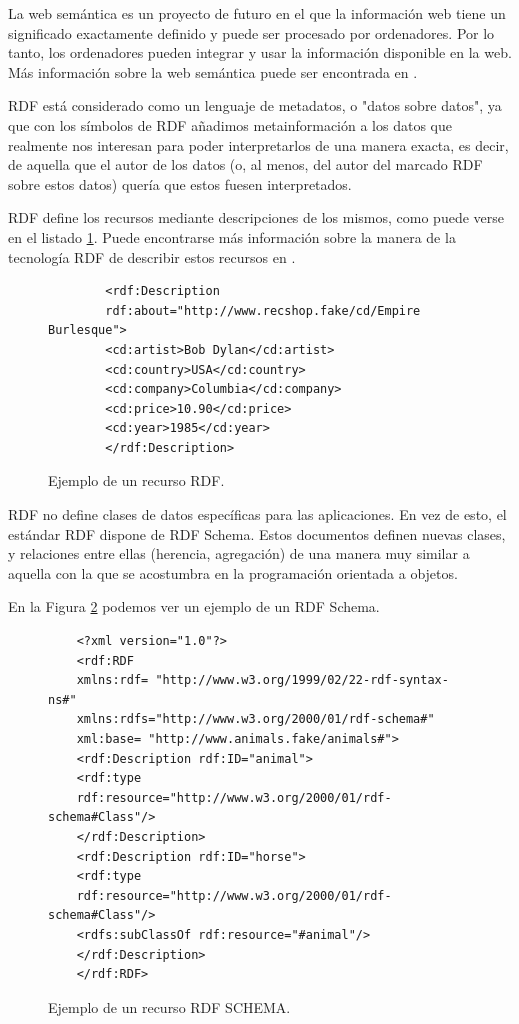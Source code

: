 La web semántica es un proyecto de futuro en el que la información web tiene un significado exactamente definido y puede ser procesado por ordenadores. Por lo tanto, los ordenadores pueden integrar y usar la información disponible en la web. Más información sobre la web semántica puede ser encontrada en \cite{iswc2007}.

RDF está considerado como un lenguaje de metadatos, o "datos sobre datos", ya que con los símbolos de RDF añadimos metainformación a los datos que realmente nos interesan para poder interpretarlos de una manera exacta, es decir, de aquella que el autor de los datos (o, al menos, del autor del marcado RDF sobre estos datos) quería que estos fuesen interpretados.

RDF define los recursos mediante descripciones de los mismos, como puede verse en el listado \ref{fig:ejemploRDF1}. Puede encontrarse más información sobre la manera de la tecnología RDF de describir estos recursos en \cite{champin2002rdf}.

\begin{figure}[h]
	\centering
	\begin{verbatim}
		<rdf:Description
		rdf:about="http://www.recshop.fake/cd/Empire Burlesque">
		<cd:artist>Bob Dylan</cd:artist>
		<cd:country>USA</cd:country>
		<cd:company>Columbia</cd:company>
		<cd:price>10.90</cd:price>
		<cd:year>1985</cd:year>
		</rdf:Description>
	\end{verbatim}
	\caption{ Ejemplo de un recurso RDF.}
	\label{fig:ejemploRDF1}
\end{figure}


RDF no define clases de datos específicas para las aplicaciones. En vez de esto, el estándar RDF dispone de RDF Schema. Estos documentos definen nuevas clases, y relaciones entre ellas (herencia, agregación) de una manera muy similar a aquella con la que se acostumbra en la programación orientada a objetos. 

En la Figura \ref{fig:ejemploRDF2} podemos ver un ejemplo de un RDF Schema.


\begin{figure}[t]
	\centering
\begin{verbatim}
	<?xml version="1.0"?>
	<rdf:RDF
	xmlns:rdf= "http://www.w3.org/1999/02/22-rdf-syntax-ns#"
	xmlns:rdfs="http://www.w3.org/2000/01/rdf-schema#"
	xml:base= "http://www.animals.fake/animals#">
	<rdf:Description rdf:ID="animal">
	<rdf:type
	rdf:resource="http://www.w3.org/2000/01/rdf-schema#Class"/>
	</rdf:Description>
	<rdf:Description rdf:ID="horse">
	<rdf:type
	rdf:resource="http://www.w3.org/2000/01/rdf-schema#Class"/>
	<rdfs:subClassOf rdf:resource="#animal"/>
	</rdf:Description>
	</rdf:RDF>
\end{verbatim}
	\caption{ Ejemplo de un recurso RDF SCHEMA.}
	\label{fig:ejemploRDF2}
\end{figure}

